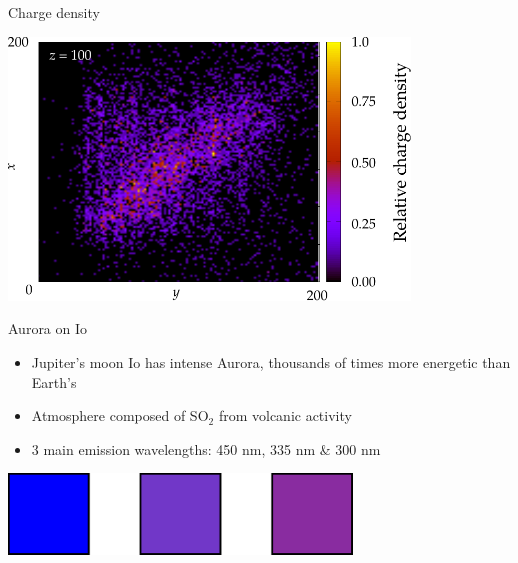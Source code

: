 \documentclass[xcolor=pdftex,dvipsnames,table,usenames,11pt]{beamer}
\begin{document}
\begin{frame}{Charge density}
\begin{center}
\includegraphics[width=0.8\textwidth]{img/charge_density.pdf}
\end{center}
\end{frame}







\begin{frame}{Aurora on Io}
  \begin{itemize}
    \item Jupiter's moon Io has intense Aurora, thousands of times more energetic than Earth's
    \item Atmosphere composed of SO$_2$ from volcanic activity
    \item 3 main emission wavelengths: 450 nm, 335 nm \& 300 nm
  \end{itemize}  \vfill
	\begin{center}
		\includegraphics[width=0.685\textwidth]{img/io_spect.pdf}
	\end{center}
\end{frame}
\end{document}
